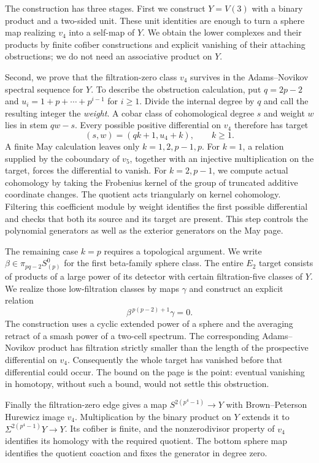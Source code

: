 The construction has three stages. First we construct $Y=V(3)$ with a
binary product and a two-sided unit. These unit identities are enough
to turn a sphere map realizing $v_4$ into a self-map of $Y$. We obtain
the lower complexes and their products by finite cofiber constructions
and explicit vanishing of their attaching obstructions; we do not need
an associative product on $Y$.

Second, we prove that the filtration-zero class $v_4$ survives in the
Adams--Novikov spectral sequence for $Y$. To describe the obstruction
calculation, put $q=2p-2$ and $u_i=1+p+\cdots+p^{i-1}$ for $i\geq1$.
Divide the internal degree by $q$ and call the resulting integer the
\emph{weight}. A cobar class of cohomological degree $s$ and weight $w$
lies in stem $qw-s$. Every possible positive differential on $v_4$
therefore has target
\begin{equation}\label{intro:targets}
 (s,w)=(qk+1,u_4+k),\qquad k\geq1.
\end{equation}
A finite May calculation leaves only $k=1,2,p-1,p$. For $k=1$, a
relation supplied by the coboundary of $v_5$, together with an injective
multiplication on the target, forces the differential to vanish. For
$k=2,p-1$, we compute actual cohomology by taking the Frobenius kernel
of the group of truncated additive coordinate changes. The quotient
acts triangularly on kernel cohomology. Filtering this coefficient
module by weight identifies the first possible differential and
checks that both its source and its target are present. This step
controls the polynomial generators as well as the exterior generators
on the May page.

The remaining case $k=p$ requires a topological argument. We write
$\beta\in\pi_{pq-2}S^0_{(p)}$ for the first beta-family sphere class.
The entire $E_2$ target consists of products of a large power of its
detector with certain filtration-five classes of $Y$.
We realize those low-filtration classes by maps
$\gamma$ and construct an explicit relation
\[
 \beta^{\,p(p-2)+1}\gamma=0.
\]
The construction uses a cyclic extended power of a sphere and the
averaging retract of a smash power of a two-cell spectrum. The corresponding
Adams--Novikov product has filtration strictly smaller than the length of
the prospective
differential on $v_4$. Consequently the whole target has vanished
before that differential could occur. The bound on the page is the
point: eventual vanishing in homotopy, without such a bound, would
not settle this obstruction.

Finally the filtration-zero edge gives a map
$S^{2(p^4-1)}\to Y$ with Brown--Peterson Hurewicz image $v_4$.
Multiplication by the binary product on $Y$ extends it to
$\Sigma^{2(p^4-1)}Y\to Y$. Its cofiber is finite, and the
nonzerodivisor property of $v_4$ identifies its homology with the
required quotient. The bottom sphere map identifies the quotient
coaction and fixes the generator in degree zero.

